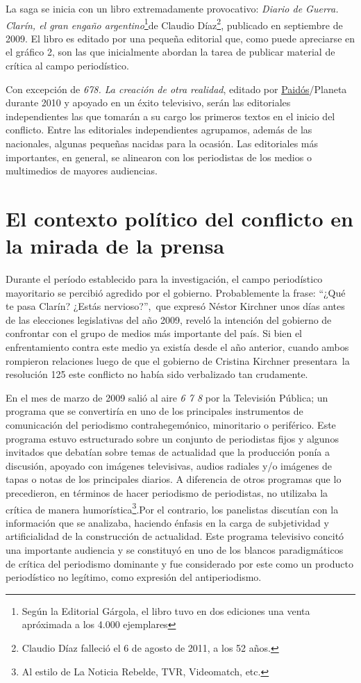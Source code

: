 La saga se inicia con un libro extremadamente provocativo: \emph{Diario de Guerra. Clarín, el gran engaño argentino}\footnote{Según la Editorial Gárgola, el libro tuvo en dos ediciones una venta apróximada a los 4.000 ejemplares}de Claudio Díaz\footnote{Claudio Díaz falleció el 6 de agosto de 2011, a los 52 años.}, publicado en septiembre de 2009. El libro es editado por una pequeña editorial que, como puede apreciarse en el gráfico 2, son las que inicialmente abordan la tarea de publicar material de crítica al campo periodístico.

Con excepción de \emph{678. La creación de otra realidad}, editado por \href{http://www.lecturalia.com/editoriales/79/paidos}{Paidós}/Planeta durante 2010 y apoyado en un éxito televisivo, serán las editoriales independientes las que tomarán a su cargo los primeros textos en el inicio del conflicto. Entre las editoriales independientes agrupamos, además de las nacionales, algunas pequeñas nacidas para la ocasión. Las editoriales más importantes, en general, se alinearon con los periodistas de los medios o multimedios de mayores audiencias.

\section{El contexto político del conflicto en la mirada de la prensa}

Durante el período establecido para la investigación, el campo periodístico mayoritario se percibió agredido por el gobierno. Probablemente la frase: ``¿Qué te pasa Clarín? ¿Estás nervioso?'',~que expresó Néstor Kirchner unos días antes de las elecciones legislativas del año 2009, reveló la intención del gobierno de confrontar con el grupo de medios más importante del país. Si bien el enfrentamiento contra este medio ya existía desde el año anterior, cuando ambos rompieron relaciones luego de que el gobierno de Cristina Kirchner presentara~la resolución 125  este conflicto no había sido verbalizado tan crudamente.

En el mes de marzo de 2009 salió al aire \emph{6 7 8} por la Televisión Pública; un programa que se convertiría en uno de los principales instrumentos de comunicación del periodismo contrahegemónico, minoritario o periférico. Este programa estuvo estructurado sobre un conjunto de periodistas fijos y algunos invitados que debatían sobre temas de actualidad que la producción ponía a discusión, apoyado con imágenes televisivas, audios radiales y/o imágenes de tapas o notas de los principales diarios. A diferencia de otros programas que lo precedieron, en términos de hacer periodismo de periodistas, no utilizaba la crítica de manera humorística\footnote{Al estilo de La Noticia Rebelde, TVR, Videomatch, etc.}.Por el contrario, los panelistas discutían con la información que se analizaba, haciendo énfasis en la carga de subjetividad y artificialidad de la construcción de actualidad. Este programa televisivo concitó una importante audiencia y se constituyó en uno de los blancos paradigmáticos de crítica del periodismo dominante y fue considerado por este como un producto periodístico no legítimo, como expresión del antiperiodismo.

